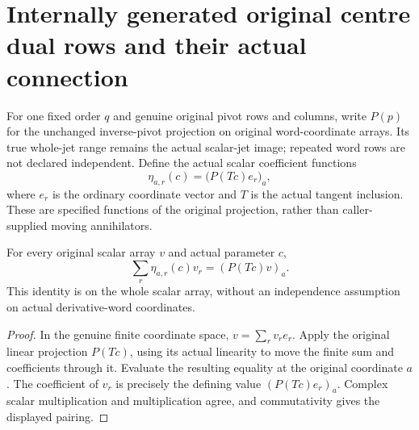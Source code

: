 \section{Internally generated original centre dual rows and their actual connection}

For one fixed order $q$ and genuine original pivot rows and columns,
write $P(p)$ for the unchanged inverse-pivot projection on original
word-coordinate arrays. Its true whole-jet range remains the actual
scalar-jet image; repeated word rows are not declared independent.
Define the actual scalar coefficient functions
\[
 \eta_{a,r}(c)=\bigl(P(Tc)e_r\bigr)_a,
\]
where $e_r$ is the ordinary coordinate vector and $T$ is the actual
tangent inclusion. These are specified functions of the original
projection, rather than caller-supplied moving annihilators.

\begin{theorem}
\label{hir:actual-centre-projected-dual-row-pairing}
\leanok
For every original scalar array $v$ and actual parameter $c$,
\[
 \sum_r\eta_{a,r}(c)v_r=(P(Tc)v)_a.
\]
This identity is on the whole scalar array, without an independence
assumption on actual derivative-word coordinates.
\end{theorem}
\begin{proof}
In the genuine finite coordinate space,
$v=\sum_r v_r e_r$. Apply the original linear projection $P(Tc)$,
using its actual linearity to move the finite sum and coefficients
through it. Evaluate the resulting equality at the original coordinate
$a$. The coefficient of $v_r$ is precisely the defining value
$(P(Tc)e_r)_a$. Complex scalar multiplication and multiplication agree,
and commutativity gives the displayed pairing.
\end{proof}

